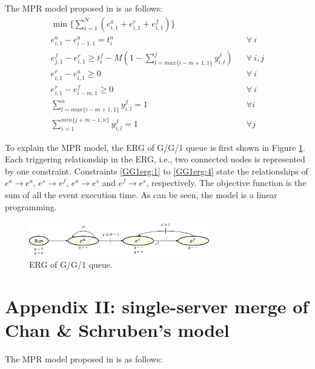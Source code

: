 \documentclass[]{interact}
\theoremstyle{plain}%
\theoremstyle{definition}
\theoremstyle{remark}
\begin{document}
The MPR model proposed in \cite{chan2008optimization} is as follows:
\begin{eqnarray}
\min\{\sum_{i=1}^N (e^{a}_{i,1}+e^{r}_{i,1}+e^{f}_{i,1})\}\nonumber\\
e^{a}_{i,1} - e^{a}_{i-1,1} = t^{a}_{i}&&\forall\ i \label{GG1erg:1}\\
e^{f}_{j,1} - e^{r}_{i,1} \ge t^{f}_{i}-M(1-\sum_{l=max\{i-m+1,1\}}^{j} y^{f}_{i,l})&&\forall\ i,j\label{GG1erg:2}\\
e^{r}_{i,1} - e^{a}_{i,1} \ge 0&&\forall\ i\label{GG1erg:3}\\
e^{r}_{i,1} - e^{f}_{i-m,1} \ge 0&&\forall\ i\label{GG1erg:4}\\
\sum_{l=max\{i-m+1,1\}}^n y^{f}_{i,l} = 1 && \forall i\\
\sum_{i=1}^{min\{j+m-1,n\}} y^{f}_{i,l} = 1 && \forall j
\end{eqnarray}

To explain the MPR model, the ERG of G/G/1 queue is first shown in Figure \ref{fig:ERG_GG1}. Each triggering relationship in the ERG, i.e., two connected nodes is represented by one constraint. Constraints \eqref{GG1erg:1} to \eqref{GG1erg:4} state the relationships of $e^a \rightarrow e^a$, $e^s\rightarrow e^f$, $e^a\rightarrow e^s$ and $e^f\rightarrow e^s$, respectively. The objective function is the sum of all the event execution time. As can be seen, the model is a linear programming. 

\begin{figure}[h]
	\centering
	\includegraphics[width=0.7\textwidth]{Figures/ERG_GG1.png}
	\caption{ERG of G/G/1 queue.}
	\label{fig:ERG_GG1}
\end{figure}

\section*{Appendix II: single-server merge of Chan \& Schruben's model}

The MPR model proposed in \cite{chan2008optimization} is as follows:
\end{document}
